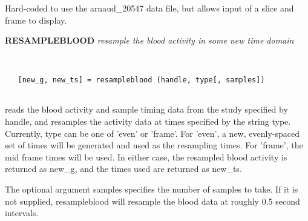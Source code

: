   Hard-coded to use the arnaud\_20547 data
  file, but allows input of a slice and
  frame to display.
\newpage


{\large\bf RESAMPLEBLOOD} {\em  resample the blood activity in some new time domain}
\begin{verbatim}


   [new_g, new_ts] = resampleblood (handle, type[, samples])


\end{verbatim}

   reads the blood activity and sample timing data from the study
   specified by handle, and resamples the activity data at times
   specified by the string type.  Currently, type can be one of 'even'
   or 'frame'.  For 'even', a new, evenly-spaced set of times will be
   generated and used as the resampling times.  For 'frame', the mid
   frame times will be used.  In either case, the resampled blood
   activity is returned as new\_g, and the times used are returned as
   new\_ts.
 
   The optional argument samples specifies the number of samples
   to take.  If it is not supplied, resampleblood will resample the
   blood data at roughly 0.5 second intervals.
\newpage














